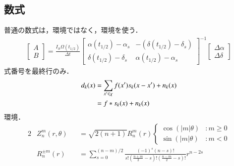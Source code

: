 \documentclass[10pt,a4paper]{ltjsarticle}           %
\newcommand{\mySubsection}[1] {
    \subsection{#1}
    \vspace{-5pt}
}
\begin{document}
\mySubsection{数式}
普通の数式は，{}環境ではなく，{}環境を使う．
\begin{align}
    \begin{bmatrix}
        A \\
        B
    \end{bmatrix} = \frac{I_S \Omega(t_{1/2})}{\varDelta t}
    \begin{bmatrix}
        \alpha(t_{1/2}) - \alpha_s & -\left( \delta(t_{1/2}) - \delta_s \right) \\
        \delta(t_{1/2}) - \delta_s & \alpha(t_{1/2}) - \alpha_s
    \end{bmatrix}^{-1}
    \begin{bmatrix}
        \varDelta \alpha \\
        \varDelta \delta
    \end{bmatrix}
\end{align}
式番号を最終行のみ．
\begin{align}
    d_k(x) & = \sum_{x' \in \chi}{f(x')s_k(x-x')} + n_k(x) \notag \\
    & = f \ast s_k(x) + n_k(x) \label{eq:eq_1}
\end{align}
{}環境．
\begin{alignat}{2}
    &Z_{n}^{m}(r,\theta) && = \sqrt{2(n+1)} R_{n}^{m}(r)
    \begin{cases}
        \cos{(\left|m\right|\theta)} &  : m \geq 0 \\
        \sin{(\left|m\right|\theta)} &  : m < 0
    \end{cases} \\
    &R_{n}^{\pm m}(r)    && = \sum_{s=0}^{(n-m)/2} {\frac{(-1)^s (n-s)!}{s! (\frac{n+m}{2} - s)! (\frac{n-m}{2} - s)!} r^{n-2s}}
\end{alignat}
\end{document}
